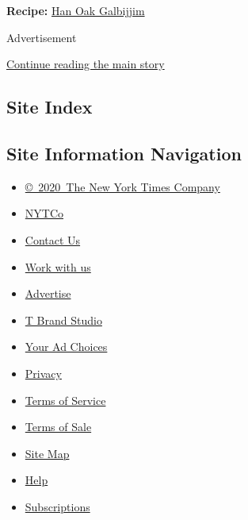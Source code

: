 \textbf{Recipe:}
\href{https://cooking.nytimes3xbfgragh.onion/recipes/1019918-han-oak-galbijjim}{Han
Oak Galbijjim}

Advertisement

\protect\hyperlink{after-bottom}{Continue reading the main story}

\hypertarget{site-index}{%
\subsection{Site Index}\label{site-index}}

\hypertarget{site-information-navigation}{%
\subsection{Site Information
Navigation}\label{site-information-navigation}}

\begin{itemize}
\tightlist
\item
  \href{https://help.nytimes3xbfgragh.onion/hc/en-us/articles/115014792127-Copyright-notice}{©~2020~The
  New York Times Company}
\end{itemize}

\begin{itemize}
\tightlist
\item
  \href{https://www.nytco.com/}{NYTCo}
\item
  \href{https://help.nytimes3xbfgragh.onion/hc/en-us/articles/115015385887-Contact-Us}{Contact
  Us}
\item
  \href{https://www.nytco.com/careers/}{Work with us}
\item
  \href{https://nytmediakit.com/}{Advertise}
\item
  \href{http://www.tbrandstudio.com/}{T Brand Studio}
\item
  \href{https://www.nytimes3xbfgragh.onion/privacy/cookie-policy\#how-do-i-manage-trackers}{Your
  Ad Choices}
\item
  \href{https://www.nytimes3xbfgragh.onion/privacy}{Privacy}
\item
  \href{https://help.nytimes3xbfgragh.onion/hc/en-us/articles/115014893428-Terms-of-service}{Terms
  of Service}
\item
  \href{https://help.nytimes3xbfgragh.onion/hc/en-us/articles/115014893968-Terms-of-sale}{Terms
  of Sale}
\item
  \href{https://spiderbites.nytimes3xbfgragh.onion}{Site Map}
\item
  \href{https://help.nytimes3xbfgragh.onion/hc/en-us}{Help}
\item
  \href{https://www.nytimes3xbfgragh.onion/subscription?campaignId=37WXW}{Subscriptions}
\end{itemize}
